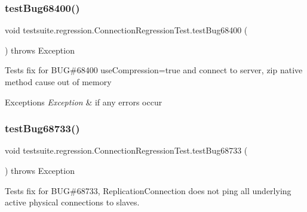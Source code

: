\subsubsection{\texorpdfstring{test\+Bug68400()}{testBug68400()}}
{\footnotesize\ttfamily void testsuite.\+regression.\+Connection\+Regression\+Test.\+test\+Bug68400 (\begin{DoxyParamCaption}{ }\end{DoxyParamCaption}) throws Exception}

Tests fix for B\+UG\#68400 use\+Compression=true and connect to server, zip native method cause out of memory


\begin{DoxyExceptions}{Exceptions}
{\em Exception} & if any errors occur \\
\hline
\end{DoxyExceptions}
\mbox{\label{classtestsuite_1_1regression_1_1_connection_regression_test_a9d54ba5c540e24424893bc15c83312ac}} 
\subsubsection{\texorpdfstring{test\+Bug68733()}{testBug68733()}}
{\footnotesize\ttfamily void testsuite.\+regression.\+Connection\+Regression\+Test.\+test\+Bug68733 (\begin{DoxyParamCaption}{ }\end{DoxyParamCaption}) throws Exception}

Tests fix for B\+UG\#68733, Replication\+Connection does not ping all underlying active physical connections to slaves.


